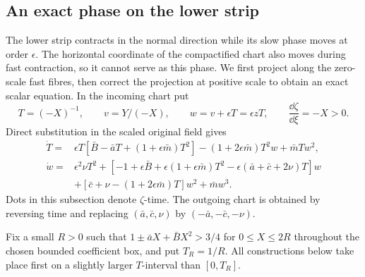 \subsection{An exact phase on the lower strip}

The lower strip contracts in the normal direction while its slow phase
moves at order $\epsilon$.  The horizontal coordinate of the
compactified chart also moves during fast contraction, so it cannot
serve as this phase.  We first project along the zero-scale fast
fibres, then correct the projection at positive scale to obtain an
exact scalar equation.  In the incoming chart put
\[
 T=(-X)^{-1},\qquad v=Y/(-X),\qquad w=v+\epsilon T=\epsilon zT,
 \qquad \frac{\dd\zeta}{\dd\xi}=-X>0.
\]
Direct substitution in the scaled original field gives
\begin{equation}\label{rw:transitions:compact-lower}
\begin{aligned}
 \dot T={}&\epsilon T[\bar B-\bar aT+(1+\epsilon\bar m)T^2]
       -(1+2\epsilon\bar m)T^2w+\bar mTw^2,\\
 \dot w={}&\epsilon^2\nu T^2+
 [-1+\epsilon\bar B+\epsilon(1+\epsilon\bar m)T^2
                  -\epsilon(\bar a+\bar c+2\nu)T]w\\
 &+[\bar c+\nu-(1+2\epsilon\bar m)T]w^2+\bar m w^3.
\end{aligned}
\end{equation}
Dots in this subsection denote $\zeta$-time. The outgoing chart is
obtained by reversing time and replacing
$(\bar a,\bar c,\nu)$ by $(-\bar a,-\bar c,-\nu)$.

Fix a small $R>0$ such that
$1\pm\bar aX+\bar BX^2>3/4$ for $0\le X\le2R$ throughout
the chosen bounded coefficient box, and put $T_R=1/R$.
All constructions below take place first on a slightly larger
$T$-interval than $[0,T_R]$.

